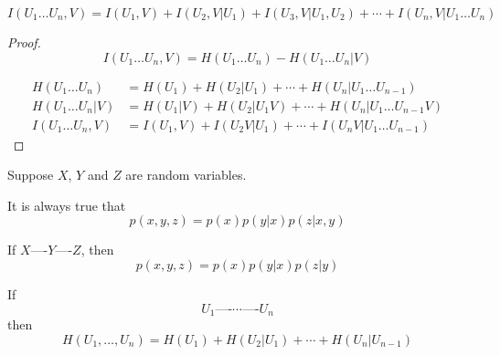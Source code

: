 \begin{theorem}
    \[
        I(U_1\ldots U_n,V) = I(U_1,V) + I(U_2,V\vert U_1    ) + I(U_3,V\vert U_1, U_2) + \cdots + I(U_n, V \vert U_1\ldots U_n)
    \]
\end{theorem}
\begin{proof}
    \[
        I(U_1\ldots U_n, V) = H(U_1\ldots U_n) - H(U_1\ldots U_n \vert V)    
    \]
    
    \[
        \begin{aligned}
            H(U_1\ldots U_n) &= H(U_1) + H(U_2\vert U_1) + \cdots + H(U_n \vert U_1 \ldots U_{n-1})\\
            H(U_1\ldots U_n \vert V) &= H(U_1 \vert V) + H(U_2\vert U_1 V) + \cdots + H(U_n \vert U_1 \ldots U_{n-1} V)\\
            I(U_1\ldots U_n, V) &= I(U_1,V) + I(U_2 V \vert U_1) + \cdots + I(U_n V \vert U_1 \ldots U_{n-1})
        \end{aligned}
    \]
\end{proof}

\begin{remark}
    Suppose $X$, $Y$ and $Z$ are random variables.
    
    It is always true that
    \[
        p(x,y,z) = p(x)p(y\vert x) p(z\vert x,y)
    \]
    
    If $X \text{----} Y \text{----} Z$, then
    \[
        p(x,y,z) = p(x)p(y\vert x) p(z\vert y)
    \]
\end{remark}

\begin{proposition}
    If
    \[
        U_1 \text{----} \cdots \text{----} U_n    
    \]
    then
    \[
    H(U_1, \ldots, U_n) = H(U_1) + H(U_2 \vert U_1) + \cdots + H(U_n \vert U_{n-1})
    \]    
\end{proposition}

